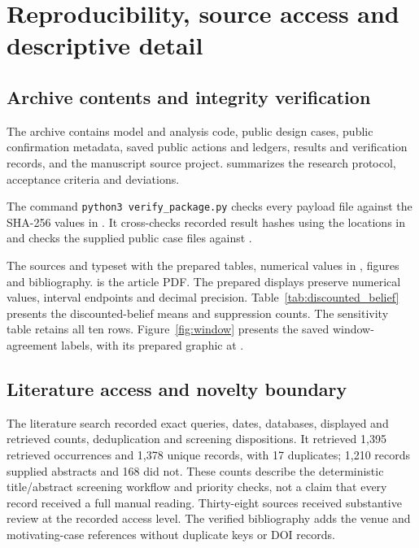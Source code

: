 \documentclass[preprint,11pt,authoryear]{elsarticle}
\begin{document}
\section{Reproducibility, source access and descriptive detail}\label{app:repro}
\subsection{Archive contents and integrity verification}
The archive contains model and analysis code, public design cases, public confirmation metadata, saved public actions and ledgers, results and verification records, and the manuscript source project.  summarizes the research protocol, acceptance criteria and deviations.

The command \texttt{python3 verify\_package.py} checks every payload file against the SHA-256 values in . It cross-checks recorded result hashes using the locations in  and checks the supplied public case files against .

The sources  and  typeset with the prepared tables, numerical values in , figures and bibliography.  is the article PDF. The prepared displays preserve numerical values, interval endpoints and decimal precision. Table~\ref{tab:discounted_belief} presents the discounted-belief means and suppression counts. The sensitivity table retains all ten rows. Figure~\ref{fig:window} presents the saved window-agreement labels, with its prepared graphic at .










\subsection{Literature access and novelty boundary}
The literature search recorded exact queries, dates, databases, displayed and retrieved counts, deduplication and screening dispositions. It retrieved 1,395 retrieved occurrences and 1,378 unique records, with 17 duplicates; 1,210 records supplied abstracts and 168 did not. These counts describe the deterministic title/abstract screening workflow and priority checks, not a claim that every record received a full manual reading. Thirty-eight sources received substantive review at the recorded access level. The verified bibliography adds the venue and motivating-case references without duplicate keys or DOI records.
\end{document}
